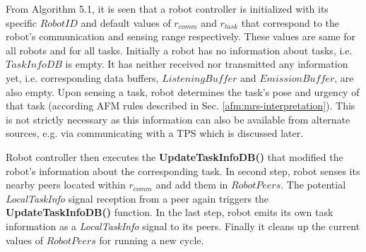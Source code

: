 From Algorithm 5.1, it is seen that a robot controller is initialized with its specific $RobotID$ and default values of $r_{comm}$ and $r_{task}$ that correspond to the robot's communication and sensing range respectively.   These values are same for all robots and for all tasks. Initially a robot has no information about tasks, i.e. {$TaskInfoDB$} is empty. It has neither received nor transmitted any information yet, i.e. corresponding data buffers, $ListeningBuffer$ and $EmissionBuffer$, are also empty. Upon sensing a task, robot determines the task's pose and urgency of that task (according AFM rules described in Sec. \ref{afm:mrs-interpretation}). This is not strictly necessary as this information can also be available from alternate sources, e.g. via communicating with a TPS which is discussed later.

Robot controller then executes the \textbf{UpdateTaskInfoDB()} that modified the robot's information about the corresponding task. In second step, robot senses its nearby peers located within $r_{comm}$ and add them in $RobotPeers$. The potential \textit{LocalTaskInfo} signal reception from a  peer again triggers the \textbf{UpdateTaskInfoDB()} function. In the last step, robot emits its own task information as a \textit{LocalTaskInfo} signal to its peers. Finally it cleans up the current values of $RobotPeers$ for running a new cycle.
%
